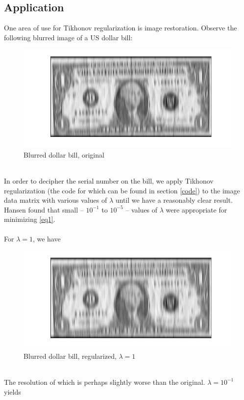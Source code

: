\documentclass[12pt]{article}
\begin{document}
\begin{flushleft}
\section{Application}

One area of use for Tikhonov regularization is image restoration. Observe the following blurred image of a US dollar bill:

\begin{figure}[H]
	\centering
	\captionsetup{justification=centering}
	\includegraphics[scale=0.55]{images/dollarblur.png}
	\caption{Blurred dollar bill, original}
\end{figure}
\ \\

In order to decipher the serial number on the bill, we apply Tikhonov regularization (the code for which can be found in section \ref{code}) to the image data matrix with various values of $\lambda$ until we have a reasonably clear result. Hansen \cite{hansen} found that small -- $10^{-1}$ to $10^{-5}$ -- values of $\lambda$ were appropriate for minimizing \eqref{eq1}.
\ \\
\ \\
For $\lambda  = 1$, we have

\begin{figure}[H]
	\centering
	\captionsetup{justification=centering}
	\includegraphics[scale=0.55]{images/lambda1.png}
	\caption{Blurred dollar bill, regularized, $\lambda = 1$}
\end{figure}
\ \\
The resolution of which is perhaps slightly worse than the original. $\lambda = 10^{-1}$ yields


\end{flushleft}
\end{document}
